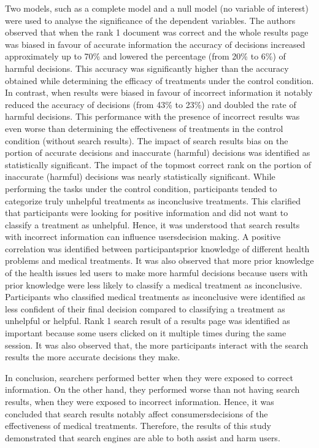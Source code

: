 \documentclass[]{article}
\begin{document}
\begin{enumerate}
Two models, such as a complete model and a null model (no variable of interest) were used to analyse the significance of the dependent variables. The authors observed that when the rank 1 document was correct and the whole results page was biased in favour of accurate information the accuracy of decisions increased approximately up to 70\% and lowered the percentage (from 20\% to 6\%) of harmful decisions. This accuracy was significantly higher than the accuracy obtained while determining the efficacy of treatments under the control condition. In contrast, when results were biased in favour of incorrect information it notably reduced the accuracy of decisions (from 43\% to 23\%) and doubled the rate of harmful decisions. This performance with the presence of incorrect results was even worse than determining the effectiveness of treatments in the control condition (without search results). The impact of search results bias on the portion of accurate decisions and inaccurate (harmful) decisions was identified as statistically significant. The impact of the topmost correct rank on the portion of inaccurate (harmful) decisions was nearly statistically significant. While performing the tasks under the control condition, participants tended to categorize truly unhelpful treatments as inconclusive treatments. This clarified that participants were looking for positive information and did not want to classify a treatment as unhelpful. Hence, it was understood that search results with incorrect information can influence users\textquotesingle decision making. A positive correlation was identified between participants\textquotesingle prior knowledge of different health problems and medical treatments. It was also observed that more prior knowledge of the health issues led users to make more harmful decisions because users with prior knowledge were less likely to classify a medical treatment as inconclusive. Participants who classified medical treatments as inconclusive were identified as less confident of their final decision compared to classifying a treatment as unhelpful or helpful. Rank 1 search result of a results page was identified as important because some users clicked on it multiple times during the same session. It was also observed that, the more participants interact with the search results the more accurate decisions they make.

In conclusion, searchers performed better when they were exposed to correct information. On the other hand, they performed worse than not having search results, when they were exposed to incorrect information. Hence, it was concluded that search results notably affect consumers\textquotesingle decisions of the effectiveness of medical treatments. Therefore, the results of this study demonstrated that search engines are able to both assist and harm users. \\


\end{enumerate}
\end{document}
